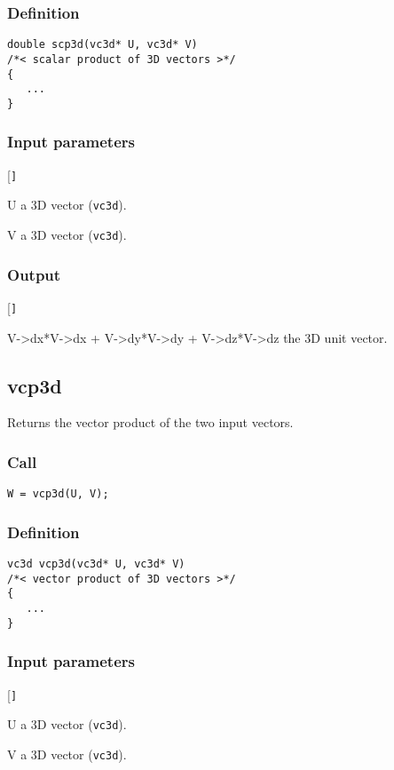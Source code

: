 \subsubsection*{Definition}
\begin{verbatim}
double scp3d(vc3d* U, vc3d* V)
/*< scalar product of 3D vectors >*/
{
   ...
}
\end{verbatim}

\subsubsection*{Input parameters}
\begin{desclist}{\tt }{\quad}[\tt ]
   \setlength\itemsep{0pt}
   \item[U] a 3D vector (\texttt{vc3d}). 
   \item[V] a 3D vector (\texttt{vc3d}).     
\end{desclist}

\subsubsection*{Output}
\begin{desclist}{\tt }{\quad}[\tt ]
   \setlength\itemsep{0pt}
   \item[V->dx*V->dx + V->dy*V->dy + V->dz*V->dz] the 3D unit vector.
\end{desclist}




\subsection{{vcp3d}}
Returns the vector product of the two input vectors.

\subsubsection*{Call}
\begin{verbatim}W = vcp3d(U, V);\end{verbatim}

\subsubsection*{Definition}
\begin{verbatim}
vc3d vcp3d(vc3d* U, vc3d* V)
/*< vector product of 3D vectors >*/
{
   ...
}
\end{verbatim}

\subsubsection*{Input parameters}
\begin{desclist}{\tt }{\quad}[\tt ]
   \setlength\itemsep{0pt}
   \item[U] a 3D vector (\texttt{vc3d}). 
   \item[V] a 3D vector (\texttt{vc3d}). 
\end{desclist}

